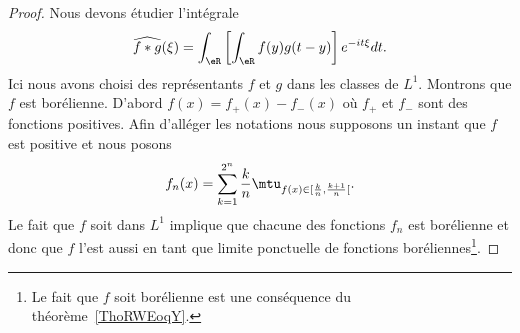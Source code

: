 \begin{proof}
	Nous devons étudier l'intégrale
	\begin{equation}
		\widehat{f*g}(\xi)=\int_{\eR}\left[ \int_{\eR} f(y)g(t-y)\right] e^{-it\xi} dt.
	\end{equation}
	Ici nous avons choisi des représentants \( f\) et \( g\) dans les classes de \( L^1\). Montrons que \( f\) est borélienne. D'abord \( f(x)=f_+(x)-f_-(x)\) où \( f_+\) et \( f_-\) sont des fonctions positives. Afin d'alléger les notations nous supposons un instant que \( f\) est positive et nous posons
	\begin{equation}
		f_n(x)=\sum_{k=1}^{2^n} \frac{ k }{ n }\mtu_{f(x)\in\mathopen[ \frac{ k }{ n } , \frac{ k+1 }{ n } [}.
	\end{equation}
	Le fait que \( f\) soit dans \( L^1\) implique que chacune des fonctions \( f_n\) est borélienne et donc que \( f\) l'est aussi en tant que limite ponctuelle de fonctions boréliennes\footnote{Le fait que \( f\) soit borélienne est une conséquence du théorème~\ref{ThoRWEoqY}.}.


\end{proof}
